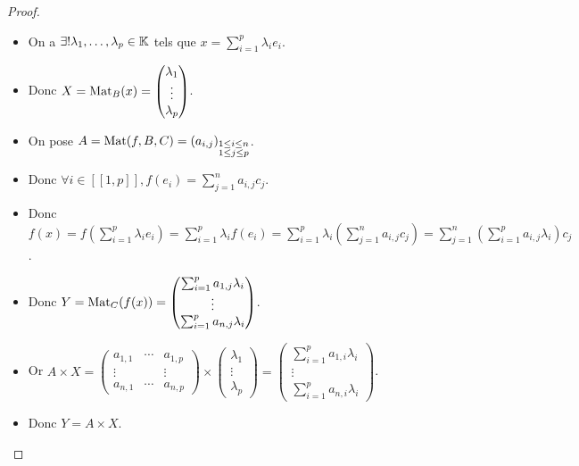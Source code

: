 \documentclass[12pt, a4paper]{report}
\begin{document}
\begin{proof}
    \begin{itemize}
        \item On a $\exists ! \lambda_1, \dots, \lambda_p \in \mathbb{K}$ tels que $x = \sum_{i=1}^p \lambda_i e_i$.
        \item Donc $X = \mathrm{Mat}_B(x) = \left(\begin{matrix} \lambda_1 \\ \vdots \\ \lambda_p \end{matrix}\right)$.
        \item On pose $A = \mathrm{Mat}(f,B,C) = (a_{i,j})_{\substack{1 \le i \le n \\ 1 \le j \le p}}$.
        \item Donc $\forall i \in [\![1,p]\!], f(e_i) = \sum_{j=1}^n a_{i,j} c_j$.
        \item Donc $f(x) = f\left(\sum_{i=1}^p \lambda_i e_i\right) = \sum_{i=1}^p \lambda_i f(e_i) = \sum_{i=1}^p \lambda_i \left(\sum_{j=1}^n a_{i,j} c_j\right) = \sum_{j=1}^n \left(\sum_{i=1}^p a_{i,j} \lambda_i\right) c_j$.
        \item Donc $Y = \mathrm{Mat}_C(f(x)) = \left(\begin{matrix} \sum_{i=1}^p a_{1,j} \lambda_i \\ \vdots \\ \sum_{i=1}^p a_{n,j} \lambda_i \end{matrix}\right)$.
        \item Or $A \times X = \left(\begin{matrix} a_{1,1} & \cdots & a_{1,p} \\ \vdots & & \vdots \\ a_{n,1} & \cdots & a_{n,p} \end{matrix}\right) \times \left(\begin{matrix} \lambda_1 \\ \vdots \\ \lambda_p \end{matrix}\right) = \left(\begin{matrix} \sum_{i=1}^p a_{1,i} \lambda_i \\ \vdots \\ \sum_{i=1}^p a_{n,i} \lambda_i \end{matrix}\right)$.
        \item Donc $Y = A \times X$.
    \end{itemize}
\end{proof}
\end{document}
